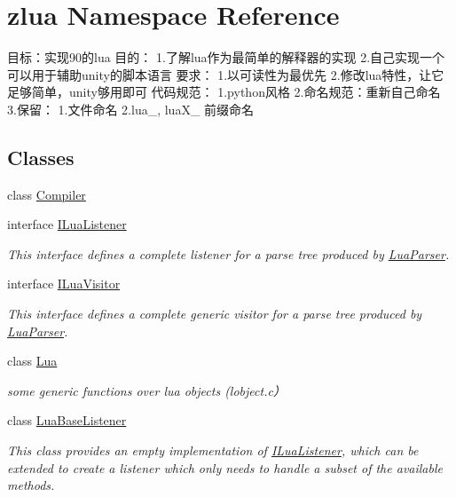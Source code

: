 \hypertarget{namespacezlua}{}\section{zlua Namespace Reference}
\label{namespacezlua}


目标：实现90的lua 目的： 1.了解lua作为最简单的解释器的实现 2.自己实现一个可以用于辅助unity的脚本语言 要求： 1.以可读性为最优先 2.修改lua特性，让它足够简单，unity够用即可 代码规范： 1.\+python风格 2.命名规范：重新自己命名 3.保留： 1.文件命名 2.\+lua\+\_\+, lua\+X\+\_\+ 前缀命名  


\subsection*{Classes}
\begin{DoxyCompactItemize}
\item 
class \mbox{\hyperlink{classzlua_1_1_compiler}{Compiler}}
\item 
interface \mbox{\hyperlink{interfacezlua_1_1_i_lua_listener}{I\+Lua\+Listener}}
\begin{DoxyCompactList}\small\item\em This interface defines a complete listener for a parse tree produced by \mbox{\hyperlink{classzlua_1_1_lua_parser}{Lua\+Parser}}. \end{DoxyCompactList}\item 
interface \mbox{\hyperlink{interfacezlua_1_1_i_lua_visitor}{I\+Lua\+Visitor}}
\begin{DoxyCompactList}\small\item\em This interface defines a complete generic visitor for a parse tree produced by \mbox{\hyperlink{classzlua_1_1_lua_parser}{Lua\+Parser}}. \end{DoxyCompactList}\item 
class \mbox{\hyperlink{classzlua_1_1_lua}{Lua}}
\begin{DoxyCompactList}\small\item\em some generic functions over lua objects (lobject.\+c） \end{DoxyCompactList}\item 
class \mbox{\hyperlink{classzlua_1_1_lua_base_listener}{Lua\+Base\+Listener}}
\begin{DoxyCompactList}\small\item\em This class provides an empty implementation of \mbox{\hyperlink{interfacezlua_1_1_i_lua_listener}{I\+Lua\+Listener}}, which can be extended to create a listener which only needs to handle a subset of the available methods. \end{DoxyCompactList}\item 

\end{DoxyCompactItemize}
